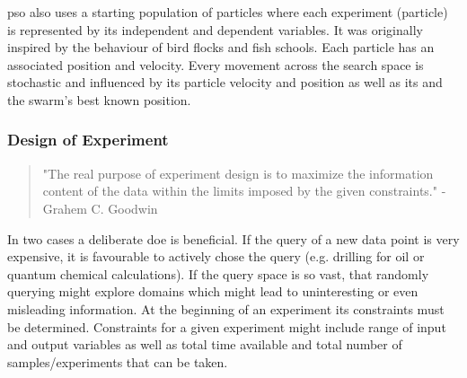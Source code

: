 \Gls{pso} also uses a starting population of particles where each experiment (particle) 
is represented by its independent and dependent variables. 
It was originally inspired by the behaviour of bird flocks and fish schools.
Each particle has an associated position and velocity. 
Every movement across the search space is stochastic and influenced by its particle velocity and position as well as its and the swarm's best known position.

\subsubsection{Design of Experiment} %
%
\begin{quote}
	{"The real purpose of experiment design is to maximize the information content of the data within the limits imposed by the given constraints."}
	- {Grahem C. Goodwin\cite{goodwin1977experiment}}
\end{quote}
%
In two cases a deliberate \gls{doe} is beneficial.
If the query of a new data point is very expensive, it is favourable to actively chose the query (e.g. drilling for oil or quantum chemical calculations). 
If the query space is so vast, that randomly querying might explore domains which might lead to uninteresting or even misleading information.
% 
At the beginning of an experiment its constraints must be determined. 
%
Constraints for a given experiment might include range of input and output variables as well as total time available and total number of samples/experiments that can be taken.\cite{goodwin1977experiment}
%

